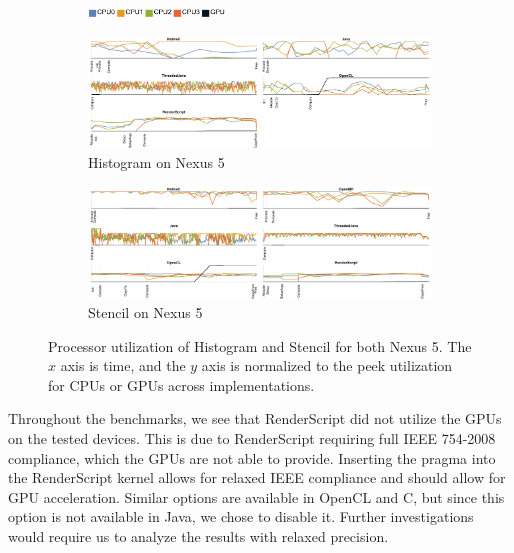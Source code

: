 \begin{figure}
  \centering

  \begin{subfigure}[b]{\textwidth}
          \centering
          \includegraphics[width=0.4\textwidth]{data/load_legend.pdf}
  \end{subfigure}

  \begin{subfigure}[b]{\textwidth}
      \centering
      \includegraphics[width=\textwidth]{data/load_histogram_nexus5.pdf}
      \caption{Histogram on Nexus 5}
      \label{fig:Histogram5}
  \end{subfigure}
  \begin{subfigure}[b]{\textwidth}
      \centering
      \includegraphics[width=\textwidth]{data/load_stencil_nexus5.pdf}
      \caption{Stencil on Nexus 5}
      \label{fig:Stencil5}
  \end{subfigure}

  \caption{Processor utilization of Histogram and Stencil for both Nexus 5. The $x$ axis is time, and the $y$ axis is normalized to the peek utilization for CPUs or GPUs across implementations.}
  \label{fig:loadHistogramStencil}
\end{figure}

Throughout the benchmarks, we see that RenderScript
	did not utilize the GPUs on the tested devices.
This is due to RenderScript requiring full
	IEEE 754-2008 compliance, which the GPUs are not able to provide.
Inserting the  pragma into the
	RenderScript kernel allows for relaxed IEEE compliance and 
	should allow for GPU acceleration.
Similar options are available in OpenCL and C, but since
	this option is not available in Java, we chose to disable it. 
Further investigations would require us to analyze the results with relaxed precision.

